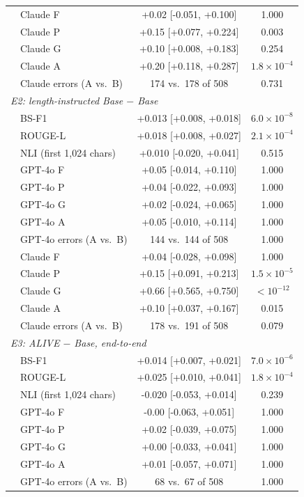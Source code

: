 \begin{table}[!htbp]
\begin{tabular}{llcc}
& Claude F & +0.02 [-0.051, +0.100] & 1.000 \\
& Claude P & +0.15 [+0.077, +0.224] & 0.003 \\
& Claude G & +0.10 [+0.008, +0.183] & 0.254 \\
& Claude A & +0.20 [+0.118, +0.287] & $1.8{\times}10^{-4}$ \\
& Claude errors (A vs.\ B) & 174 vs.\ 178 of 508 & 0.731 \\
\multicolumn{4}{l}{\textit{E2: length-instructed Base $-$ Base}} \\
& BS-F1 & +0.013 [+0.008, +0.018] & $6.0{\times}10^{-8}$ \\
& ROUGE-L & +0.018 [+0.008, +0.027] & $2.1{\times}10^{-4}$ \\
& NLI (first 1,024 chars) & +0.010 [-0.020, +0.041] & 0.515 \\
& GPT-4o F & +0.05 [-0.014, +0.110] & 1.000 \\
& GPT-4o P & +0.04 [-0.022, +0.093] & 1.000 \\
& GPT-4o G & +0.02 [-0.024, +0.065] & 1.000 \\
& GPT-4o A & +0.05 [-0.010, +0.114] & 1.000 \\
& GPT-4o errors (A vs.\ B) & 144 vs.\ 144 of 508 & 1.000 \\
& Claude F & +0.04 [-0.028, +0.098] & 1.000 \\
& Claude P & +0.15 [+0.091, +0.213] & $1.5{\times}10^{-5}$ \\
& Claude G & +0.66 [+0.565, +0.750] & $<10^{-12}$ \\
& Claude A & +0.10 [+0.037, +0.167] & 0.015 \\
& Claude errors (A vs.\ B) & 178 vs.\ 191 of 508 & 0.079 \\
\multicolumn{4}{l}{\textit{E3: ALIVE $-$ Base, end-to-end}} \\
& BS-F1 & +0.014 [+0.007, +0.021] & $7.0{\times}10^{-6}$ \\
& ROUGE-L & +0.025 [+0.010, +0.041] & $1.8{\times}10^{-4}$ \\
& NLI (first 1,024 chars) & -0.020 [-0.053, +0.014] & 0.239 \\
& GPT-4o F & -0.00 [-0.063, +0.051] & 1.000 \\
& GPT-4o P & +0.02 [-0.039, +0.075] & 1.000 \\
& GPT-4o G & +0.00 [-0.033, +0.041] & 1.000 \\
& GPT-4o A & +0.01 [-0.057, +0.071] & 1.000 \\
& GPT-4o errors (A vs.\ B) & 68 vs.\ 67 of 508 & 1.000 \\

\end{tabular}
\end{table}

